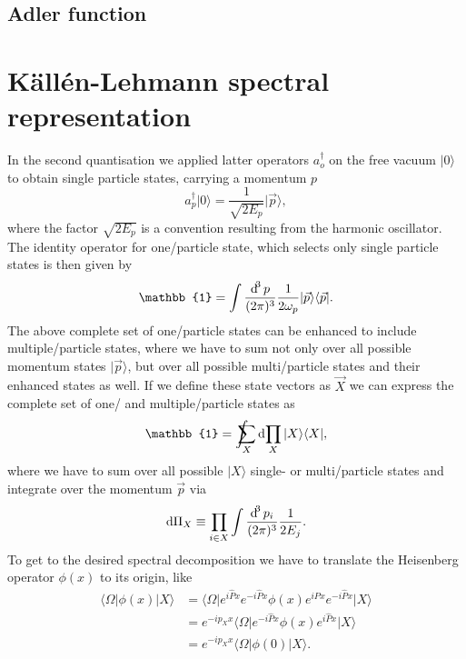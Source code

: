 \documentclass[../../index.tex]{subfiles}
\begin{document}
  \section{Adler function}

  \chapter{Källén-Lehmann spectral representation}
In the second quantisation we applied latter operators $a_o^\dagger$ on the free
vacuum $\vert 0 \rangle$ to obtain single particle states, carrying a momentum
$p$
\begin{equation}
  a_p^\dagger \vert 0 \rangle = \frac{1}{\sqrt{2 E_p}}\vert \vec p \rangle,
\end{equation}
where the factor $\sqrt{2 E_p}$ is a convention resulting from the harmonic
oscillator. The identity operator for one\-/particle state, which selects only
single particle states is then given by
\begin{equation}
  \mathbb{1} = \int \frac{\dif^3 p}{(2\pi)^3} \frac{1}{2\omega_p} \vert \vec p \rangle \langle \vec p \vert.
\end{equation}
The above complete set of one\-/particle states can be enhanced to include
multiple\-/particle states, where we have to sum not only over all possible
momentum states $\vert \vec p \rangle$, but over all possible multi\-/particle
states and their enhanced states as well. If we define these state vectors as
$\vec X$ we can express the complete set of one\-/ and multiple\-/particle
states as
\begin{equation}
  \mathbb{1} = \intsum_{X} \dif \prod_X \vert X \rangle \langle  X \vert,
\end{equation}
where we have to sum over all possible $\vert X \rangle$ single- or
multi\-/particle states and integrate over the momentum $\vec p$ via
\begin{equation}
  \dif \Pi_X \equiv \prod_{i \in X} \int \frac{\dif^3 p_i}{(2\pi)^3} \frac{1}{2 E_j}.
\end{equation}
To get to the desired spectral decomposition we have to translate the Heisenberg
operator $\phi(x)$ to its origin, like
\begin{equation}
  \begin{split}
    \langle \Omega \vert \phi(x) \vert X \rangle
    &=  \langle \Omega \vert e^{i \hat P x}e^{-i \hat P x} \phi(x) e^{i \hat P x}e^{-i \hat P x} \vert X \rangle \\
    &= e^{-i p_X x} \langle \Omega \vert e^{-i \hat P x} \phi(x) e^{i \hat P x} \vert X \rangle \\
    &= e^{-i p_X x} \langle \Omega \vert \phi(0) \vert X \rangle.
  \end{split}
\end{equation}
\end{document}
